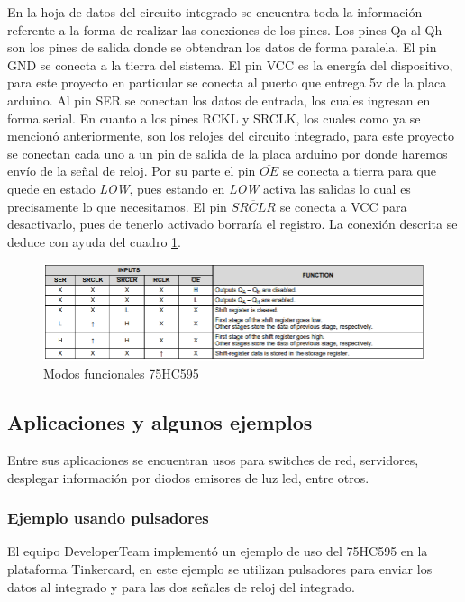 \documentclass{article}
\begin{document}
En la hoja de datos del circuito integrado se encuentra toda la información referente a la forma de realizar las conexiones de los pines.
Los pines Qa al Qh son los pines de salida donde se obtendran los datos de forma paralela. El pin GND se conecta a la tierra del sistema. El pin VCC es la energía del dispositivo, para este proyecto en particular se conecta al puerto que entrega 5v de la placa arduino. Al pin SER se conectan los datos de entrada, los cuales ingresan en forma serial. En cuanto a los pines RCKL y SRCLK, los cuales como ya se mencionó anteriormente, son los relojes del circuito integrado, para este proyecto se conectan cada uno a un pin de salida de la placa arduino por donde haremos envío de la señal de reloj. Por su parte el pin $\overline{OE}$ se conecta a tierra para que quede en estado \textit{LOW}, pues estando en \textit{LOW} activa las salidas lo cual es precisamente lo que necesitamos. El pin $\overline{SRCLR}$ se conecta a VCC para desactivarlo, pues de tenerlo activado borraría el registro. 
La conexión descrita se deduce con ayuda del cuadro \ref{fig:Modos}.


    \begin{figure}[H]
    \includegraphics[width=12cm]{imagen/Modos.png}
    \centering
    \caption{Modos funcionales 75HC595\footnotemark}
    \label{fig:Modos}
    \end{figure}
    

    
    
\subsection{Aplicaciones y algunos ejemplos}
Entre sus aplicaciones se encuentran usos para switches de red, servidores, desplegar información por diodos emisores de luz led, entre otros.

\subsubsection{Ejemplo usando pulsadores}
El equipo DeveloperTeam implementó un ejemplo de uso del 75HC595 en la plataforma Tinkercard, en este ejemplo se utilizan pulsadores para enviar los datos al integrado y para las dos señales de reloj del integrado.
\end{document}
